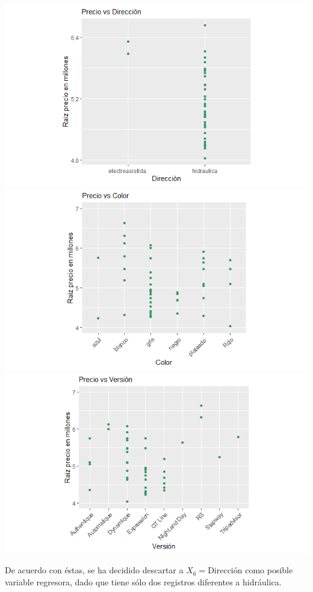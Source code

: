 \documentclass[12pt,a0,portrait]{a0poster}
\begin{document}
\begin{multicols}{2}
\begin{center}
	\includegraphics[scale=1]{PvsD}\\
	\includegraphics[scale=1]{PvsC}
	\includegraphics[scale=1]{PvsV}
\end{center}

De acuerdo con \'estas, se ha decidido descartar a $X_6= \text{Direcci\'on}$ como posible variable regresora, dado que tiene s\'olo dos registros diferentes a hidr\'aulica. 


\end{multicols}
\end{document}
